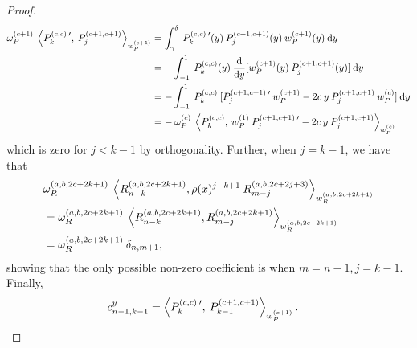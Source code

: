 \documentclass[11pt, oneside]{article}   	%
\newcommand{\ddy}{\frac{\mathrm{d}}{\mathrm{d}y}}
\newcommand{\jac}{{P}}
\newcommand{\genjac}{R}
\newcommand{\genjacnmk}{\genjac_{n-k}}
\newcommand{\genjacmmj}{\genjac_{m-j}}
\newcommand{\genjacw}{w_\genjac}
\newcommand{\jacw}{w_P}
\newcommand{\normgenjac}{\omega_\genjac}
\newcommand{\normjac}{\omega_P}
\begin{document}
\begin{proof}
\begin{align*}
	\normjac^{(c+1)} \: \ip< \jac_k^{(c,c) \: \prime}, \: \jac_{j}^{(c+1,c+1)} >_{\jacw^{(c+1)}} &= \int_{\gamma}^\delta \: \jac_k^{(c,c) \: \prime}(y) \: \jac_{j}^{(c+1,c+1)}(y) \: \jacw^{(c+1)}(y) \: \D y \\
	&= - \int_{-1}^1 \: \jac_k^{(c,c)}(y) \: \ddy [\jacw^{(c+1)}(y) \: \jac_{j}^{(c+1,c+1)}(y)] \: \D y \\
	&= - \int_{-1}^1 \: \jac_k^{(c,c)} \: [ \jac_{j}^{(c+1,c+1) \: \prime} \: \jacw^{(c+1)} - 2 c \: y \: \jac_{j}^{(c+1,c+1)} \:\jacw^{(c)} ] \: \D y \\
	&= - \: \normjac^{(c)} \: \ip< \jac_k^{(c,c)}, \: \jacw^{(1)} \: \jac_{j}^{(c+1,c+1) \: \prime} -2c \:y \: \jac_{j}^{(c+1,c+1)} >_{\jacw^{(c)}}
\end{align*}
which is zero for $j < k-1$ by orthogonality. Further, when $j = k-1$, we have that
\begin{align*}
	&\normgenjac^{(a, b, 2c+2k+1)} \: \ip< \genjacnmk^{(a,b,2c+2k+1)}, \rho(x)^{j-k+1} \: \genjacmmj^{(a,b,2c+2j+3)} >_{\genjacw^{(a,b,2c+2k+1)}} \\
	&= \normgenjac^{(a, b, 2c+2k+1)} \: \ip< \genjacnmk^{(a,b,2c+2k+1)}, \genjacmmj^{(a,b,2c+2k+1)} >_{\genjacw^{(a,b,2c+2k+1)}} \\
	&= \normgenjac^{(a, b, 2c+2k+1)} \: \delta_{n,m+1},
\end{align*}
showing that the only possible non-zero coefficient is when $m=n-1, j=k-1$. Finally,
\begin{align*}
	c_{n-1,k-1}^y &= \ip< \jac_k^{(c,c) \: \prime}, \: \jac_{k-1}^{(c+1,c+1)} >_{\jacw^{(c+1)}}.
\end{align*}


\end{proof}
\end{document}
